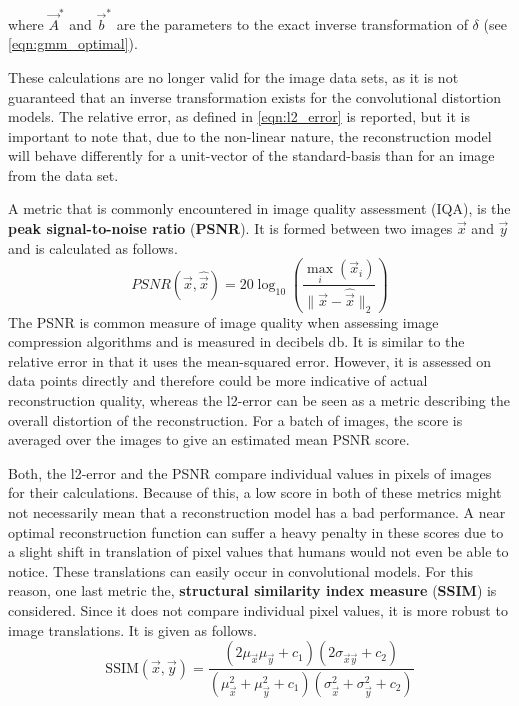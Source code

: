 where $\vec A ^*$ and $\vec b^*$ are the parameters to the exact inverse transformation of $\delta$ 
(see \ref{eqn:gmm_optimal}).

These calculations are no longer valid for the image data sets, as it is not guaranteed that 
an inverse transformation exists for the convolutional distortion models. The relative
error, as defined in \ref{eqn:l2_error} is reported, but it is important to
note that, due to the non-linear nature, the reconstruction model will behave differently 
for a unit-vector 
of the standard-basis than for an image from the data set.

A metric that is commonly encountered in image quality assessment (IQA), is the 
\textbf{peak signal-to-noise ratio} (\textbf{PSNR}).
It is formed between two images $\vec x$ and $\vec y$ and is calculated as follows.
\[
    PSNR(\vec x, \hat {\vec x}) = 20 \log_{10} \left (\frac {\max_i(\vec x_i)} {\|\vec x-\hat {\vec x}\|_2} \right )
\]
The PSNR is common measure of image quality when assessing image compression algorithms and is measured in decibels db.
It is similar to the relative error in that it uses the mean-squared error. 
However, it is assessed on data points directly and therefore could be more indicative of actual 
reconstruction quality, whereas the l2-error can be seen as a metric describing the 
overall distortion of the reconstruction.
For a batch of images, the score is averaged over the images to give an estimated mean PSNR score.

Both, the l2-error and the PSNR compare individual values in pixels of images for their calculations.
Because of this, a low score in both of these metrics might not necessarily mean that a reconstruction
model has a bad performance. A near optimal reconstruction function can suffer a heavy penalty
in these scores due to a slight shift in translation of pixel values that humans would not even be
able to notice.
These translations can easily occur in convolutional models.
For this reason, one last metric the, \textbf{structural similarity index measure} (\textbf{SSIM})
is considered. Since it does not compare individual pixel values, it is more robust to 
image translations.
It is given as follows.
\[
    \text{SSIM}(\vec x, \vec y) 
    = \frac {(2 \mu_{\vec x} \mu_{\vec y} + c_1)(2\sigma_{\vec x\vec y} + c_2)}
    {(\mu_{\vec x}^2 + \mu_{\vec y}^2 + c_1)(\sigma_{\vec x}^2 + \sigma_{\vec y}^2 + c_2)}
\]


